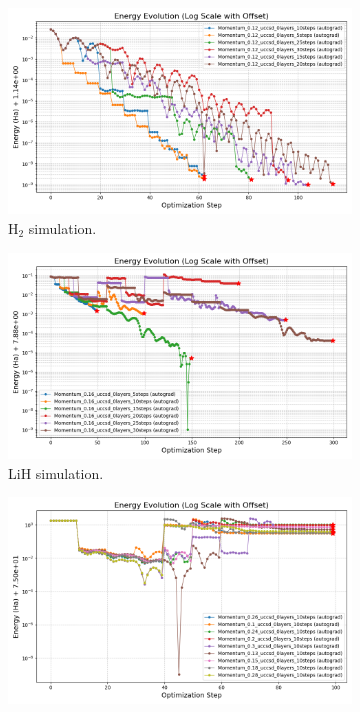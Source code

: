 \begin{figure}[H]
  \centering
  \begin{subfigure}{0.45\textwidth}
    \includegraphics[width=\textwidth]{data/NumIterations/results_H2/energy_evolution_log_offset.png}
    \caption{H$_2$ simulation.}
    \label{fig:num_iterations_h2}
  \end{subfigure}
  \begin{subfigure}{0.45\textwidth}
    \includegraphics[width=\textwidth]{data/NumIterations/results_LiH/energy_evolution_log_offset.png}
    \caption{LiH simulation.}
    \label{fig:num_iterations_lih}
  \end{subfigure}
  \begin{subfigure}{0.45\textwidth}
    \includegraphics[width=\textwidth]{data/StepSize/results_H2O/energy_evolution_log_offset.png}

\end{subfigure}
\end{figure}
